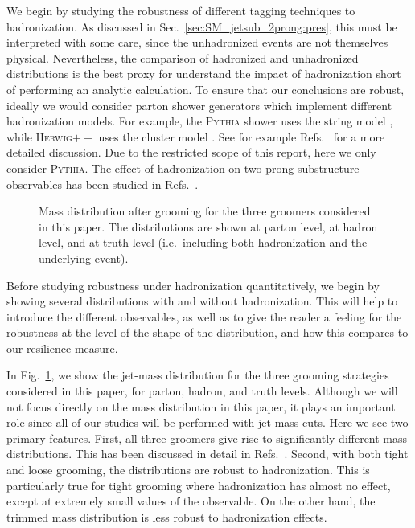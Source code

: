 We begin by studying the robustness of different tagging techniques to hadronization.
%
As discussed in Sec.~\ref{sec:SM_jetsub_2prong:pres}, this must be interpreted with some care, since the unhadronized events are not themselves physical.
%
Nevertheless, the comparison of hadronized and unhadronized distributions is the best proxy for understand the impact of hadronization short of performing an analytic calculation.
%
To ensure that our conclusions are robust, ideally we would consider parton shower generators which implement different hadronization models.
%
For example, the \textsc{Pythia} shower uses the string model \cite{Andersson:1983ia,Andersson:1998tv}, while \textsc{Herwig}$++$ uses the cluster model \cite{Webber:1983if,Marchesini:1987cf}.
%
See for example Refs.~\cite{Buckley:2011ms,Skands:2011pf,Skands:2012ts} for a more detailed discussion.
%
Due to the restricted scope of this report, here we only consider \textsc{Pythia}.
%
The effect of hadronization on two-prong substructure observables has been studied in Refs.~\cite{Larkoski:2015kga,Salam:2016yht,Larkoski:2017iuy,Larkoski:2017cqq}.

\begin{figure}
  \caption{Mass distribution after grooming for the three groomers
    considered in this paper. The distributions are shown at parton
    level, at hadron level, and at truth level (i.e.\ including both
    hadronization and the underlying event).}\label{fig:SM_jetsub_2prong:mass-distribution}
\end{figure}

Before studying robustness under hadronization quantitatively, we begin by showing several distributions with and without hadronization.
%
This will help to introduce the different observables, as well as to give the reader a feeling for the robustness at the level of the shape of the distribution, and how this compares to our resilience measure. 

In Fig.~\ref{fig:SM_jetsub_2prong:mass-distribution}, we show the jet-mass distribution for the three grooming strategies considered in this paper, for parton, hadron, and truth levels.
%
Although we will not focus directly on the mass distribution in this paper, it plays an important role since all of our studies will be performed with jet mass cuts.
%
Here we see two primary features.
%
First, all three groomers give rise to significantly different mass distributions.
%
This has been discussed in detail in Refs.~\cite{Dasgupta:2013ihk,Larkoski:2014wba}.
%
Second, with both tight and loose grooming, the distributions are robust to hadronization.
%
This is particularly true for tight grooming where hadronization has almost no effect, except at extremely small values of the observable.
%
On the other hand, the trimmed mass distribution is less robust to hadronization effects. 


